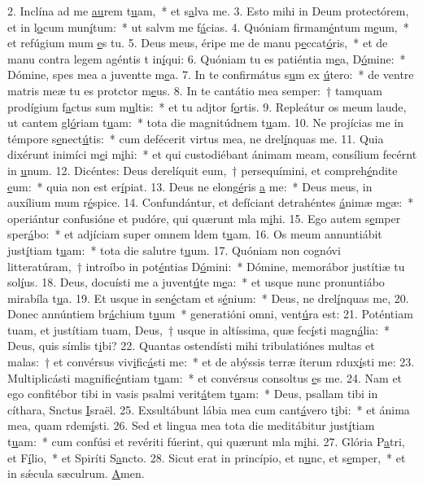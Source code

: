 2. Inclína ad me \uline{au}rem t\uline{u}am,~* et s\uline{a}lva me.
3. Esto mihi in Deum protectórem, et in l\uline{o}cum mun\uline{í}tum:~* ut salvm me f\uline{á}cias.
4. Quóniam firmam\uline{é}ntum m\uline{e}um,~* et refúgium mum \uline{e}s tu.
5. Deus meus, éripe me de manu p\uline{e}ccat\uline{ó}ris,~* et de manu contra legem agéntis t in\uline{í}qui:
6. Quóniam tu es patiéntia m\uline{e}a, D\uline{ó}mine:~* Dómine, spes mea a juventte m\uline{e}a.
7. In te confirmátus s\uline{u}m ex \uline{ú}tero:~* de ventre matris meæ tu es protctor m\uline{e}us.
8. In te cantátio mea semper:~† tamquam prodígium f\uline{a}ctus sum m\uline{u}ltis:~* et tu adjtor f\uline{o}rtis.
9. Repleátur os meum laude, ut cantem gl\uline{ó}riam t\uline{u}am:~* tota die magnitúdnem t\uline{u}am.
10. Ne projícias me in témpore s\uline{e}nect\uline{ú}tis:~* cum defécerit virtus mea, ne drel\uline{í}nquas me.
11. Quia dixérunt inimíci m\uline{e}i m\uline{i}hi:~* et qui custodiébant ánimam meam, consílium fecérnt in \uline{u}num.
12. Dicéntes: Deus derelíquit eum,~† persequímini, et compreh\uline{é}ndite \uline{e}um:~* quia non est  er\uline{í}piat.
13. Deus ne elong\uline{é}ris \uline{a} me:~* Deus meus, in auxílium mum r\uline{é}spice.
14. Confundántur, et defíciant detrahéntes \uline{á}nimæ m\uline{e}æ:~* operiántur confusióne et pudóre, qui quærunt mla m\uline{i}hi.
15. Ego autem s\uline{e}mper sper\uline{á}bo:~* et adjíciam super omnem ldem t\uline{u}am.
16. Os meum annuntiábit just\uline{í}tiam t\uline{u}am:~* tota die salutre t\uline{u}um.
17. Quóniam non cognóvi litteratúram,~† introíbo in pot\uline{é}ntias D\uline{ó}mini:~* Dómine, memorábor justítiæ tu sol\uline{í}us.
18. Deus, docuísti me a juvent\uline{ú}te m\uline{e}a:~* et usque nunc pronuntiábo mirabíla t\uline{u}a.
19. Et usque in sen\uline{é}ctam et s\uline{é}nium:~* Deus, ne drel\uline{í}nquas me,
20. Donec annúntiem br\uline{á}chium t\uline{u}um~* generatióni omni,  vent\uline{ú}ra est:
21. Poténtiam tuam, et justítiam tuam, Deus,~† usque in altíssima, quæ fec\uline{í}sti magn\uline{á}lia:~* Deus, quis símlis t\uline{i}bi?
22. Quantas ostendísti mihi tribulatiónes multas et malas:~† et convérsus viv\uline{i}fic\uline{á}sti me:~* et de abýssis terræ íterum rdux\uline{í}sti me:
23. Multiplicásti magnific\uline{é}ntiam t\uline{u}am:~* et convérsus consoltus \uline{e}s me.
24. Nam et ego confitébor tibi in vasis psalmi verit\uline{á}tem t\uline{u}am:~* Deus, psallam tibi in cíthara, Snctus \uline{I}sraël.
25. Exsultábunt lábia mea cum cant\uline{á}vero t\uline{i}bi:~* et ánima mea, quam rdem\uline{í}sti.
26. Sed et lingua mea tota die meditábitur just\uline{í}tiam t\uline{u}am:~* cum confúsi et revériti fúerint, qui quærunt mla m\uline{i}hi.
27. Glória P\uline{a}tri, et F\uline{í}lio,~* et Spiríti S\uline{a}ncto.
28. Sicut erat in princípio, et n\uline{u}nc, et s\uline{e}mper,~* et in sǽcula sæculrum. \uline{A}men.
